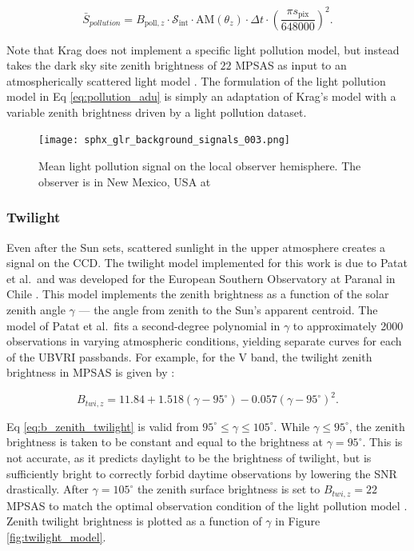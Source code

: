 \begin{equation} \label{eq:pollution_adu}
  \bar{S}_{pollution} = B_{\mathrm{poll},z} \cdot \mathcal{S}_\mathrm{int} \cdot \textrm{AM}(\theta_z) \cdot \Delta t \cdot \left( \frac{\pi s_\mathrm{pix}}{648000} \right)^2.
\end{equation}

Note that Krag does not implement a specific light pollution model, but instead takes the dark sky site zenith brightness of $22$ MPSAS as input to an atmospherically scattered light model \cite{krag2003}. The formulation of the light pollution model in Eq \ref{eq:pollution_adu} is simply an adaptation of Krag's model with a variable zenith brightness driven by a light pollution dataset.

\begin{figure}[ht]
  \centering
  \texttt{[image: sphx\_glr\_background\_signals\_003.png]}
  \caption{Mean light pollution signal on the local observer hemisphere. The observer is in New Mexico, USA at
  \pogslla}
  \label{fig:pollution_hemi}
\end{figure}

\subsubsection{Twilight}

Even after the Sun sets, scattered sunlight in the upper atmosphere creates a signal on the CCD. The twilight model implemented for this work is due to Patat et al.\ and was developed for the European Southern Observatory at Paranal in Chile \cite{patat2006}. This model implements the zenith brightness as a function of the solar zenith angle $\gamma$ --- the angle from zenith to the Sun's apparent centroid. The model of Patat et al.\ fits a second-degree polynomial in $\gamma$ to approximately 2000 observations in varying atmospheric conditions, yielding separate curves for each of the UBVRI passbands. For example, for the V band, the twilight zenith brightness in MPSAS is given by \cite{patat2006}:

\begin{equation} \label{eq:b_zenith_twilight}
  B_{twi,z} = 11.84 + 1.518(\gamma - 95^\circ) - 0.057 (\gamma -  95^\circ)^2.
\end{equation}

Eq \ref{eq:b_zenith_twilight} is valid from $95^\circ \leq \gamma \leq 105^\circ$. While $\gamma \le 95^\circ$, the zenith brightness is taken to be constant and equal to the brightness at $\gamma = 95^\circ$. This is not accurate, as it predicts daylight to be the brightness of twilight, but is sufficiently bright to correctly forbid daytime observations by lowering the SNR drastically. After $\gamma = 105^\circ$ the zenith surface brightness is set to $B_{twi,z} = 22$ MPSAS to match the optimal observation condition of the light pollution model \cite{krag2003}. Zenith twilight brightness is plotted as a function of $\gamma$ in Figure \ref{fig:twilight_model}.

